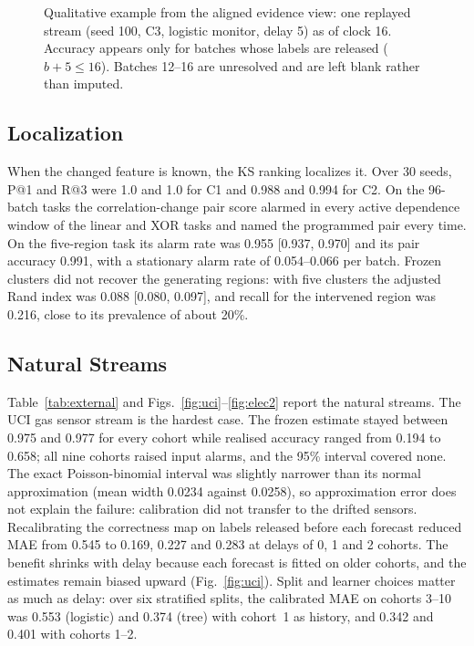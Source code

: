 \begin{figure}[t]
\centering
\resizebox{\columnwidth}{!}{}
\caption{Qualitative example from the aligned evidence view: one replayed stream (seed 100, C3, logistic monitor, delay 5) as of clock 16. Accuracy appears only for batches whose labels are released ($b+5\le16$). Batches 12--16 are unresolved and are left blank rather than imputed.}
\label{fig:case}
\end{figure}

\subsection{Localization}
When the changed feature is known, the KS ranking localizes it. Over 30 seeds, P@1 and
R@3 were 1.0 and 1.0 for C1 and 0.988 and 0.994 for C2. On the 96-batch tasks the
correlation-change pair score alarmed in every active dependence window of the linear
and XOR tasks and named the programmed pair every time. On the five-region task its
alarm rate was 0.955 [0.937, 0.970] and its pair accuracy 0.991, with a stationary
alarm rate of 0.054--0.066 per batch. Frozen clusters did not recover the generating
regions: with five clusters the adjusted Rand index was 0.088 [0.080, 0.097], and
recall for the intervened region was 0.216, close to its prevalence of about 20\%.

\subsection{Natural Streams}
\label{sec:res-natural}


Table~\ref{tab:external} and Figs.~\ref{fig:uci}--\ref{fig:elec2} report the natural
streams. The UCI gas sensor stream is the hardest case. The frozen estimate stayed
between 0.975 and 0.977 for every cohort while realised accuracy ranged from 0.194 to
0.658; all nine cohorts raised input alarms, and the 95\% interval covered none. The
exact Poisson-binomial interval was slightly narrower than its normal approximation
(mean width 0.0234 against 0.0258), so approximation error does not explain the
failure: calibration did not transfer to the drifted sensors. Recalibrating the
correctness map on labels released before each forecast reduced MAE from 0.545 to
0.169, 0.227 and 0.283 at delays of 0, 1 and 2 cohorts. The benefit shrinks with delay
because each forecast is fitted on older cohorts, and the estimates remain biased
upward (Fig.~\ref{fig:uci}). Split and learner choices matter as much as delay: over
six stratified splits, the calibrated MAE on cohorts 3--10 was 0.553 (logistic) and
0.374 (tree) with cohort~1 as history, and 0.342 and 0.401 with cohorts 1--2.

